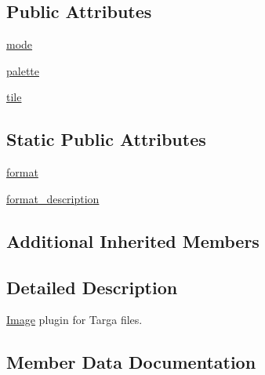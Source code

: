\subsection*{Public Attributes}
\begin{DoxyCompactItemize}
\item 
\hyperlink{classPIL_1_1TgaImagePlugin_1_1TgaImageFile_a641cfa91ce0c36a271796664b3705c8d}{mode}
\item 
\hyperlink{classPIL_1_1TgaImagePlugin_1_1TgaImageFile_a285006a1e9acd7331b45794ae502a9e8}{palette}
\item 
\hyperlink{classPIL_1_1TgaImagePlugin_1_1TgaImageFile_ae3e5952f936dce0cb053958f53b3ef38}{tile}
\end{DoxyCompactItemize}
\subsection*{Static Public Attributes}
\begin{DoxyCompactItemize}
\item 
\hyperlink{classPIL_1_1TgaImagePlugin_1_1TgaImageFile_a2b205272257a1dfce1aa492aa72cd544}{format}
\item 
\hyperlink{classPIL_1_1TgaImagePlugin_1_1TgaImageFile_ad92d58110820104e2f7a398a9cafbe55}{format\+\_\+description}
\end{DoxyCompactItemize}
\subsection*{Additional Inherited Members}


\subsection{Detailed Description}
\hyperlink{namespacePIL_1_1Image}{Image} plugin for Targa files. 



\subsection{Member Data Documentation}
\mbox{\label{classPIL_1_1TgaImagePlugin_1_1TgaImageFile_a2b205272257a1dfce1aa492aa72cd544}} 
